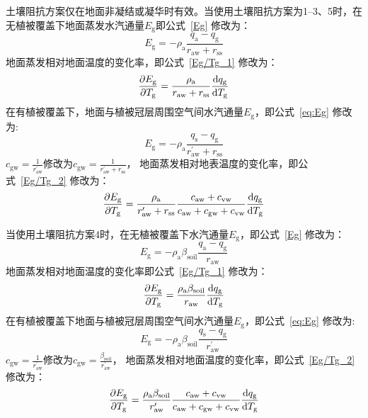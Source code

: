 土壤阻抗方案仅在地面非凝结或凝华时有效。当使用土壤阻抗方案为1--3、5时，在无植被覆盖下地面蒸发水汽通量\(E_{\mathrm{g}}\)即公式~\eqref{Eg} 修改为：
\begin{equation}
  E_{\mathrm{g}}=-\rho_{\mathrm{a}} \frac{q_{\mathrm{a}}-q_{\mathrm{g}}}{r_{\mathrm{a w}} + r_{\mathrm{s s}}}
\end{equation}
地面蒸发相对地面温度的变化率，即公式~\eqref{Eg/Tg_1} 修改为：
\begin{equation}
  \frac{\partial E_{\mathrm{g}}}{\partial T_{\mathrm{g}}}= \frac{\rho_{\mathrm{a}}}{r_{\mathrm{a w}} + r_{\mathrm{s s}}} \frac{{\rm d} q_{\mathrm{g}}}{{\rm d} T_{\mathrm{g}}}
\end{equation}
在有植被覆盖下，地面与植被冠层周围空气间水汽通量\(E_{\mathrm{g}}\)，即公式~\eqref{eq:Eg} 修改为:
\begin{equation}
  E_{\mathrm{g}}=-\rho_{\mathrm{a}} \frac{q_{\mathrm{s}}-q_{\mathrm{g}}}{r_{\mathrm{a w}}^{\prime}+r_{\mathrm{ss}}}
\end{equation}
$c_{\mathrm {gw}}=\frac{1}{r_{\mathrm{aw}}^\prime}$修改为$c_{\mathrm {gw}}=\frac{1}{r_{\mathrm{aw}} ^\prime+r_{\mathrm{ss}}}$，
地面蒸发相对地表温度的变化率，即公式~\eqref{Eg/Tg_2} 修改为：
\begin{equation}
  \frac{\partial E_{\mathrm{g}}}{\partial T_{\mathrm{g}}}=
  \frac{\rho_{\mathrm{a}}}{r_{\mathrm{a w}}^{\prime} + r_{\mathrm{s s}}} \frac{c_{\mathrm{aw}}+c_{\mathrm{vw}}}{c_{\mathrm{aw}}+c_{\mathrm{gw}}+c_{\mathrm{vw}}} \frac{{\rm d} q_{\mathrm{g}}}{{\rm d} T_{\mathrm{g}}}
\end{equation}

当使用土壤阻抗方案4时，在无植被覆盖下水汽通量\(E_{\mathrm{g}}\)，即公式~\eqref{Eg} 修改为：
\begin{equation}\label{Eg_modify}
  E_{\mathrm{g}}=-\rho_{\mathrm{a}}\beta_{\mathrm{soil}} \frac{q_{\mathrm{a}}-q_{\mathrm{g}}}{r_{\mathrm{a w}}}
\end{equation}
地面蒸发相对地面温度的变化率即公式~\eqref{Eg/Tg_1} 修改为：
\begin{equation}
  \frac{\partial E_{\mathrm{g}}}{\partial T_{\mathrm{g}}}= \frac{\rho_{\mathrm{a}} \beta_{\mathrm{soil}}}{r_{\mathrm{a w}} } \frac{{\rm d} q_{\mathrm{g}}}{{\rm d} T_{\mathrm{g}}}
\end{equation}
在有植被覆盖下地面与植被冠层周围空气间水汽通量\(E_{\mathrm{g}}\)，即公式~\eqref{eq:Eg} 修改为:
\begin{equation}
  E_{\mathrm{g}}=-\rho_{\mathrm{a}} \beta_{\mathrm{soil}} \frac{q_{\mathrm{s}}-q_{\mathrm{g}}}{r_{\mathrm{a w}}^{\prime}}
\end{equation}
$c_{\mathrm {gw}}=\frac{1}{r_{\mathrm{aw}}^\prime}$修改为$c_{\mathrm {gw}}=\frac{\beta_{\mathrm{soil}}}{r_{\mathrm{aw}}^\prime}$，
地面蒸发相对地面温度的变化率，即公式~\eqref{Eg/Tg_2} 修改为：
\begin{equation}
  \frac{\partial E_{\mathrm{g}}}{\partial T_{\mathrm{g}}}=
  \frac{\rho_{\mathrm{a}} \beta_{\mathrm{soil}}}{r_{\mathrm{a w}}^{\prime}} \frac{c_{\mathrm{aw}}+c_{\mathrm{vw}}}{c_{\mathrm{aw}}+c_{\mathrm{gw}}+c_{\mathrm{vw}}} \frac{{\rm d} q_{\mathrm{g}}}{{\rm d} T_{\mathrm{g}}}
\end{equation}
